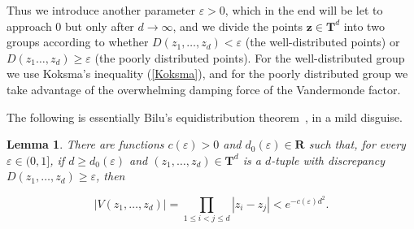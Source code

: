 \documentclass[10pt]{amsart}
\def\T{\mathbf{T}}
\def\R{\mathbf{R}}
\newtheorem{lemma}[subsubsection]{Lemma}
\theoremstyle{remark}
\numberwithin{equation}{subsection}
\def\numequation{\addtocounter{subsubsection}{1}\begin{equation}}
\begin{document}
Thus we introduce another parameter $\varepsilon > 0$, which in the end will be let to approach $0$ but only after $d \to \infty$, and we divide the points $\mathbf{z} \in \T^d$ into two groups
according to whether $D(z_1, \ldots, z_d) < \varepsilon$ (the well-distributed points) or $D(z_1 \ldots, z_d) \geq \varepsilon$ (the poorly distributed points). For the well-distributed group  we use Koksma's inequality (\ref{Koksma}), and for the poorly distributed group we take advantage of the overwhelming damping force of the Vandermonde factor. 

The following is essentially Bilu's equidistribution theorem~\cite{Bilu}, in a mild disguise.


\begin{lemma} \label{non-equidistribution} 
There  are functions $c(\varepsilon) > 0$ and $d_0(\varepsilon) \in \R$  such that, for every $\varepsilon \in (0,1]$, if $d \geq d_0(\varepsilon)$  and $(z_1, \ldots, z_d) \in \T^d$ is a $d$-tuple with discrepancy $D(z_1, \ldots, z_d) \geq \varepsilon$, then
\numequation \label{damping grace}
|V(z_1, \ldots, z_d)| = \prod_{1 \leq i < j \leq d} |z_i - z_j| < e^{-c(\varepsilon) d^2}. 
\end{equation}
\end{lemma}
\end{document}
